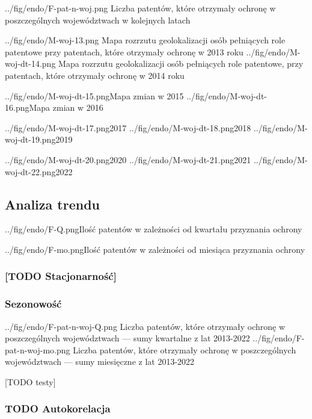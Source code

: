   \figside
{../fig/endo/F-pat-n-woj.png}
{ Liczba patentów, które otrzymały ochronę w poszczególnych województwach 
  w kolejnych latach }

  \figsides
{../fig/endo/M-woj-13.png}
{ Mapa rozrzutu geolokalizacji osób pełniących role patentowe 
  przy patentach, które otrzymały ochronę w 2013 roku}
{../fig/endo/M-woj-dt-14.png}
{ Mapa rozrzutu geolokalizacji osób pełniących role patentowe, 
  przy patentach, które otrzymały ochronę w 2014 roku}

  \newpage\figsides
{../fig/endo/M-woj-dt-15.png}{Mapa zmian w 2015}
{../fig/endo/M-woj-dt-16.png}{Mapa zmian w 2016}

  \figsidesTri
{../fig/endo/M-woj-dt-17.png}{2017}
{../fig/endo/M-woj-dt-18.png}{2018}
{../fig/endo/M-woj-dt-19.png}{2019}

  \figsidesTri
{../fig/endo/M-woj-dt-20.png}{2020}
{../fig/endo/M-woj-dt-21.png}{2021}
{../fig/endo/M-woj-dt-22.png}{2022}






  \newpage\subsection
{Analiza trendu}



  \fig
{../fig/endo/F-Q.png}{Ilość patentów w zależności od kwartału przyznania ochrony}

  \fig
{../fig/endo/F-mo.png}{Ilość patentów w zależności od miesiąca przyznania ochrony}



  \subsubsection
{[TODO Stacjonarność]}




  \newpage\subsubsection
{Sezonowość}

  \figsides
{../fig/endo/F-pat-n-woj-Q.png}
{ Liczba patentów, które otrzymały ochronę w poszczególnych województwach 
  --- sumy kwartalne z lat 2013-2022 }
{../fig/endo/F-pat-n-woj-mo.png}
{ Liczba patentów, które otrzymały ochronę w poszczególnych województwach 
  --- sumy miesięczne z lat 2013-2022 }

[TODO testy]

  \subsubsection
{TODO Autokorelacja}